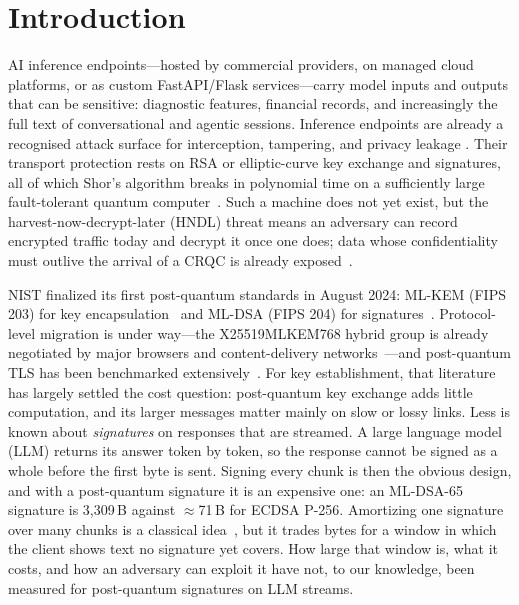 \documentclass[conference]{IEEEtran}
\begin{document}
\section{Introduction}
AI inference endpoints---hosted by commercial providers, on managed cloud platforms, or as custom
FastAPI/Flask services---carry model inputs and outputs that can be sensitive: diagnostic features,
financial records, and increasingly the full text of conversational and agentic sessions. Inference
endpoints are already a recognised attack surface for interception, tampering, and privacy leakage
\cite{tidjon2022threat,song2019privacy}. Their transport protection rests on RSA or elliptic-curve
key exchange and signatures, all of which Shor's algorithm breaks in polynomial time on a
sufficiently large fault-tolerant quantum computer~\cite{shor1997}. Such a machine does not yet
exist, but the harvest-now-decrypt-later (HNDL) threat means an adversary can record encrypted
traffic today and decrypt it once one does; data whose confidentiality must outlive the arrival of a
CRQC is already exposed~\cite{mosca2018ready,blancoromero2026hndl}.

NIST finalized its first post-quantum standards in August 2024: ML-KEM (FIPS 203) for key
encapsulation~\cite{fips203} and ML-DSA (FIPS 204) for signatures~\cite{fips204}. Protocol-level
migration is under way---the X25519MLKEM768 hybrid group is already negotiated by major browsers and
content-delivery networks~\cite{ietf-ecdhe-mlkem}---and post-quantum TLS has been benchmarked
extensively~\cite{paquin2020benchmarking,sikeridis2020authentication,montenegro2026framework,gomezcambronero2026layered}.
For key establishment, that literature has largely settled the cost question: post-quantum key
exchange adds little computation, and its larger messages matter mainly on slow or lossy links. Less
is known about \emph{signatures} on responses that are streamed. A large language model (LLM)
returns its answer token by token, so the response cannot be signed as a whole before the first byte
is sent. Signing every chunk is then the obvious design, and with a post-quantum signature it is an
expensive one: an ML-DSA-65 signature is 3,309\,B against $\approx$71\,B for ECDSA P-256. Amortizing
one signature over many chunks is a classical idea~\cite{gennaro1997streams,wong1999flows,perrig2000tesla},
but it trades bytes for a window in which the client shows text no signature yet covers. How large
that window is, what it costs, and how an adversary can exploit it have not, to our knowledge, been
measured for post-quantum signatures on LLM streams.
\end{document}
